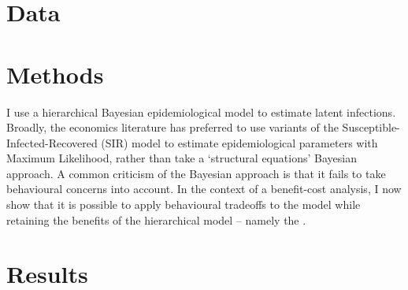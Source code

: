 \documentclass{article}
\newcommand\wordcount{}
\begin{document}
\section{Data}

\section{Methods}
I use a hierarchical Bayesian epidemiological model to estimate latent infections. Broadly, the economics literature has preferred to use variants of the Susceptible-Infected-Recovered (SIR) model to estimate epidemiological parameters with Maximum Likelihood, rather than take a `structural equations' Bayesian approach. A common criticism of the Bayesian approach is that it fails to take behavioural concerns into account. In the context of a benefit-cost analysis, I now show that it is possible to apply behavioural tradeoffs to the model while retaining the benefits of the hierarchical model -- namely the . 

\section{Results}

\wordcount
\printbibliography
\end{document}
